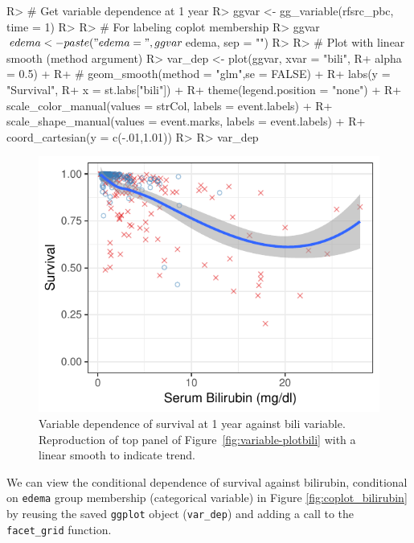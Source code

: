 \documentclass[article, nojss]{jss}
\begin{document}
\begin{Schunk}
\begin{Sinput}
R> # Get variable dependence at 1 year
R> ggvar <- gg_variable(rfsrc_pbc, time = 1)
R>
R> # For labeling coplot membership
R> ggvar$edema <- paste("edema = ", ggvar$edema, sep = "")
R>
R> # Plot with linear smooth (method argument)
R> var_dep <- plot(ggvar, xvar = "bili",
R+                 alpha = 0.5) +
R+ #  geom_smooth(method = "glm",se = FALSE) +
R+   labs(y = "Survival",
R+        x = st.labs["bili"]) +
R+   theme(legend.position = "none") +
R+   scale_color_manual(values = strCol, labels = event.labels) +
R+   scale_shape_manual(values = event.marks, labels = event.labels) +
R+   coord_cartesian(y = c(-.01,1.01))
R>
R> var_dep
\end{Sinput}
\begin{figure}[!htb]

{\centering \includegraphics{rfs-var_dep-1}

}

\caption{Variable dependence of survival at 1 year against bili variable. Reproduction of top panel of Figure~\ref{fig:variable-plotbili} with a linear smooth to indicate trend.}\label{fig:var_dep}
\end{figure}
\end{Schunk}

We can view the conditional dependence of survival against bilirubin,
conditional on \texttt{edema} group membership (categorical variable) in
Figure \ref{fig:coplot_bilirubin} by reusing the saved \texttt{ggplot}
object (\texttt{var\_dep}) and adding a call to the \texttt{facet\_grid}
function.
\end{document}
